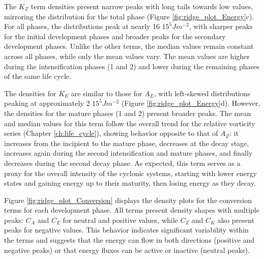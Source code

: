 The $K_Z$ term densities present narrow peaks with long tails towards low values, mirroring the distribution for the total phase (Figure \ref{fig:ridge_plot_Energy}c). For all phases, the distributions peak at nearly 16 $15^5 J m^{-2}$, with sharper peaks for the initial development phases and broader peaks for the secondary development phases. Unlike the other terms, the median values remain constant across all phases, while only the mean values vary. The mean values are higher during the intensification phases (1 and 2) and lower during the remaining phases of the same life cycle.


The densities for $K_E$ are similar to those for $A_E$, with left-skewed distributions peaking at approximately 2 $15^5 J m^{-2}$ (Figure \ref{fig:ridge_plot_Energy}d). However, the densities for the mature phases (1 and 2) present broader peaks. The mean and median values for this term follow the overall trend for the relative vorticity series (Chapter \ref{ch:life_cycle}), showing behavior opposite to that of $A_Z$: it increases from the incipient to the mature phase, decreases at the decay stage, increases again during the second intensification and mature phases, and finally decreases during the second decay phase. As expected, this term serves as a proxy for the overall intensity of the cyclonic systems, starting with lower energy states and gaining energy up to their maturity, then losing energy as they decay.

Figure \ref{fig:ridge_plot_Conversion} displays the density plots for the conversion terms for each development phase. All terms present density shapes with multiple peaks: $C_A$ and $C_E$ for neutral and positive values, while $C_Z$ and $C_K$ also present peaks for negative values. This behavior indicates significant variability within the terms and suggests that the energy can flow in both directions (positive and negative peaks) or that energy fluxes can be active or inactive (neutral peaks).


